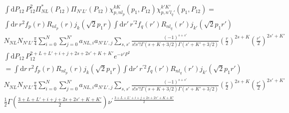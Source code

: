 \documentclass[10pt]{article}
\begin{document}
\begin{multline*}
\int \text{d} P_{12} \, P_{12}^{2} \Pi^{*}_{N L}(P_{12}) \Pi_{N' L'}(P_{12}) \chi_{p,nl_p}^{kK}(p_1,P_{12}) \chi_{p,n'l_q'}^{k'K'}(p_1,P_{12}) = \\
 \int \text{d} r\, r^{2} f_{p}(r) R_{n l_p}(r) j_{k}( \sqrt{2} p_1 r)  
 \int \text{d} r' \, r^{\prime 2} f_{q}(r') R_{n l_q}(r') j_{k'}( \sqrt{2} p_1 r')   \\
  N_{NL} N_{N'L'} \frac{ \pi}{4}  \sum_{i=0}^{N} \sum_{j=0}^{N'} a_{NL,i}  a_{N'L',j} 
 \sum_{s,s'} \frac{(-1)^{s+s'}}{s! s'! \Gamma(s+K+3/2) \Gamma(s'+K'+3/2)}  \left( \frac{r}{2} \right)^{2s+K} \left( \frac{r'}{2} \right)^{2s'+K'} \\
  \int \text{d} P_{12} \, P_{12}^{2+L+L'+i+j+2s+2s'+K+K'} e^{-\nu' P^{2}} \\
  = \int \text{d} r\, r^{2} f_{p}(r) R_{n l_p}(r) j_{k}( \sqrt{2} p_1 r)  
 \int \text{d} r' \, r^{\prime 2} f_{q}(r') R_{n l_q}(r') j_{k'}( \sqrt{2} p_1 r')   \\
  N_{NL} N_{N'L'} \frac{ \pi}{4}  \sum_{i=0}^{N} \sum_{j=0}^{N'} a_{NL,i}  a_{N'L',j} 
 \sum_{s,s'} \frac{(-1)^{s+s'}}{s! s'! \Gamma(s+K+3/2) \Gamma(s'+K'+3/2)}  \left( \frac{r}{2} \right)^{2s+K} \left( \frac{r'}{2} \right)^{2s'+K'} \\
  \frac{1}{2} \Gamma \left( \frac{3+L+L'+i+j+2s+2s'+K+K'}{2} \right) \nu^{\prime \, \frac{3+L+L'+i+j+2s+2s'+K+K'}{2} }
\end{multline*}
\end{document}
